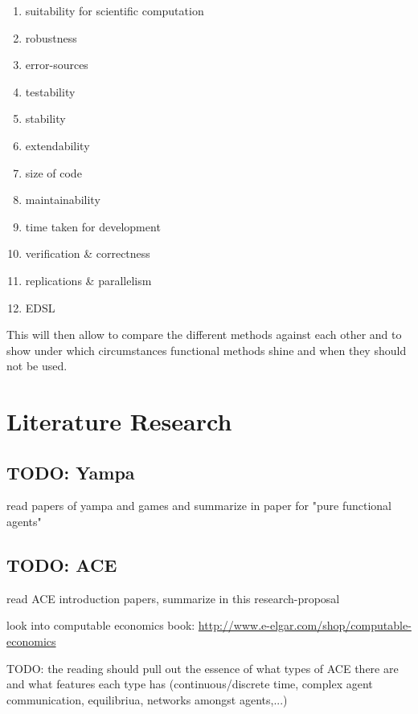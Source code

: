 \documentclass{article}
\begin{document}
\begin{enumerate}
\item suitability for scientific computation
\item robustness
\item error-sources
\item testability
\item stability
\item extendability
\item size of code
\item maintainability
\item time taken for development
\item verification \& correctness
\item replications \& parallelism
\item EDSL
\end{enumerate}

This will then allow to compare the different methods against each other and to show under which circumstances functional methods shine and when they should not be used.


\section{Literature Research}

\subsection{TODO: Yampa}
read papers of yampa and games and summarize in paper for "pure functional agents"

\subsection{TODO: ACE}
read ACE introduction papers, summarize in this research-proposal

look into computable economics book: \url{http://www.e-elgar.com/shop/computable-economics}

TODO: the reading should pull out the essence of what types of ACE there are and what features each type has (continuous/discrete time, complex agent communication, equilibriua, networks amongst agents,...)
\end{document}
